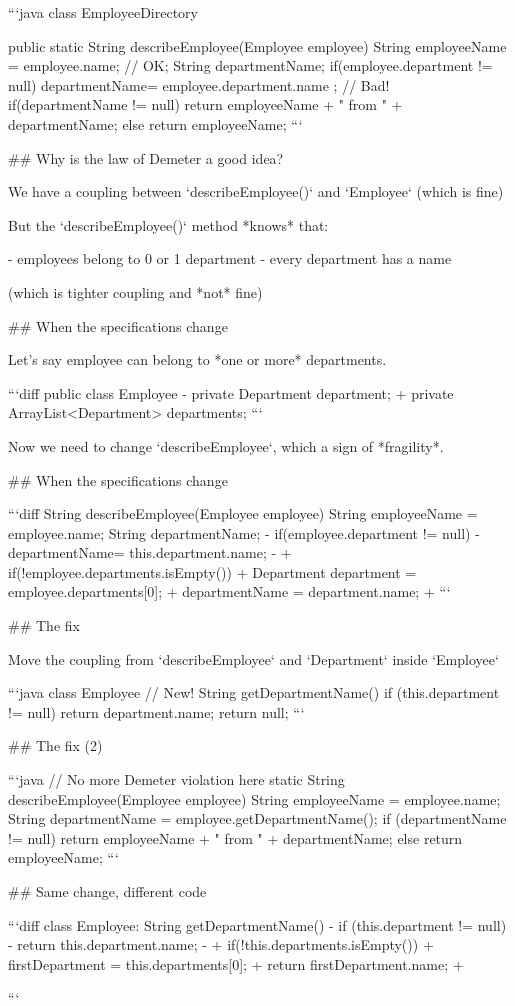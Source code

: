 ```java
class EmployeeDirectory {
  public static String describeEmployee(Employee employee) {
    String employeeName = employee.name;  // OK;
    String departmentName;
    if(employee.department != null) {
       departmentName= employee.department.name ; // Bad!
    }
    if(departmentName != null) {
      return employeeName + " from  " + departmentName;
    } else {
      return employeeName;
  }
}
```

## Why is the law of Demeter a good idea?

We have a coupling between `describeEmployee()` and `Employee`  (which is fine)

But the `describeEmployee()` method *knows* that:

- employees belong to 0 or 1 department
- every department has a name

(which is tighter coupling and *not* fine)

## When the specifications change

Let's say employee can belong to *one or more* departments.

```diff
public class Employee {
- private Department department;
+ private ArrayList<Department> departments;
}
```

Now we need to change `describeEmployee`, which a sign of *fragility*.

## When the specifications change

```diff
String describeEmployee(Employee employee) {
    String employeeName = employee.name;
    String departmentName;
-    if(employee.department != null) {
-       departmentName= this.department.name;
-    }
+    if(!employee.departments.isEmpty()) {
+        Department department = employee.departments[0];
+        departmentName = department.name;
+    }
}
```

## The fix

Move the coupling from `describeEmployee` and `Department` inside `Employee`

```java
class Employee {
    // New!
    String getDepartmentName() {
        if (this.department != null) {
            return department.name;
        }
        return null;
    }
}
```

## The fix (2)

```java
// No more Demeter violation here
static String describeEmployee(Employee employee) {
    String employeeName = employee.name;
    String departmentName = employee.getDepartmentName();
    if (departmentName != null) {
        return employeeName + " from " + departmentName;
    } else {
        return employeeName;
    }
}
```

## Same change, different code

```diff
class Employee:
   String getDepartmentName() {
-       if (this.department != null) {
-           return this.department.name;
-       }
+       if(!this.departments.isEmpty()) {
+           firstDepartment = this.departments[0];
+           return firstDepartment.name;
+      }
    }
}
```

